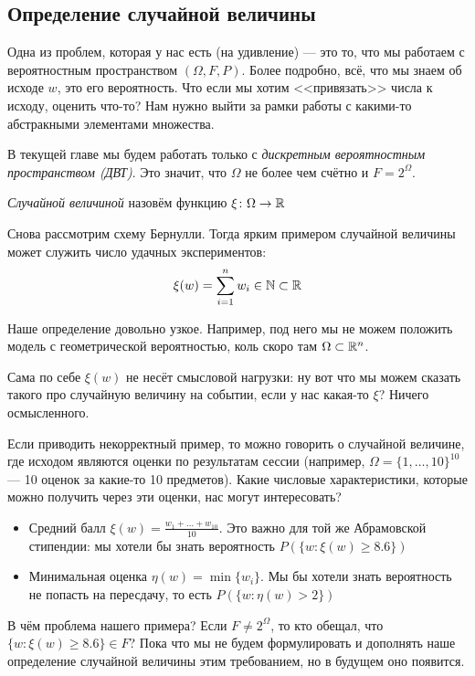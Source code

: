 \subsection{Определение случайной величины}

\begin{note}
	Одна из проблем, которая у нас есть (на удивление) --- это то, что мы работаем с вероятностным пространством $(\Omega, F, P)$. Более подробно, всё, что мы знаем об исходе $w$, это его вероятность. Что если мы хотим <<привязать>> числа к исходу, оценить что-то? Нам нужно выйти за рамки работы с какими-то абстракными элементами множества.
\end{note}

\begin{note}
	В текущей главе мы будем работать только с \textit{дискретным вероятностным пространством (ДВТ)}. Это значит, что $\Omega$ не более чем счётно и $F = 2^\Omega$.
\end{note}

\begin{definition}
	\textit{Случайной величиной} назовём функцию $\xi \colon \Omega \to \mathbb{R}$
\end{definition}

\begin{example}
	Снова рассмотрим схему Бернулли. Тогда ярким примером случайной величины может служить число удачных экспериментов:
	\[
		\xi(w) = \sum_{i = 1}^n w_i \in \mathbb{N} \subset \mathbb{R}
	\]
\end{example}

\begin{note}
	Наше определение довольно узкое. Например, под него мы не можем положить модель с геометрической вероятностью, коль скоро там $\Omega \subset \mathbb{R}^n$.
\end{note}

\begin{note}
	Сама по себе $\xi(w)$ не несёт смысловой нагрузки: ну вот что мы можем сказать такого про случайную величину на событии, если у нас какая-то $\xi$? Ничего осмысленного.
	
	Если приводить некорректный пример, то можно говорить о случайной величине, где исходом являются оценки по результатам сессии (например, $\Omega = \{1, \ldots, 10\}^{10}$ --- 10 оценок за какие-то 10 предметов). Какие числовые характеристики, которые можно получить через эти оценки, нас могут интересовать?
	\begin{itemize}
		\item Средний балл $\xi(w) = \frac{w_1 + \ldots + w_{10}}{10}$. Это важно для той же Абрамовской стипендии: мы хотели бы знать вероятность $P(\{w \colon \xi(w) \ge 8.6\})$
		
		\item Минимальная оценка $\eta(w) = \min\{w_i\}$. Мы бы хотели знать вероятность не попасть на пересдачу, то есть $P(\{w \colon \eta(w) > 2\})$
	\end{itemize}
	В чём проблема нашего примера? Если $F \neq 2^\Omega$, то кто обещал, что $\{w \colon \xi(w) \ge 8.6\} \in F$? Пока что мы не будем формулировать и дополнять наше определение случайной величины этим требованием, но в будущем оно появится.
\end{note}

